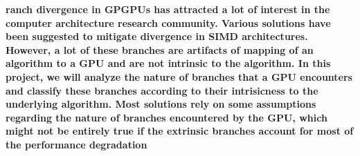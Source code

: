 
\textbf{ranch divergence in GPGPUs has attracted a lot of interest in the computer architecture research community. Various solutions have been suggested to mitigate divergence in SIMD architectures. However, a lot of these branches are artifacts of mapping of an algorithm to a GPU and are not intrinsic to the algorithm. In this project, we will analyze the nature of branches that a GPU encounters and classify these branches according to their intrisicness to the underlying algorithm. Most solutions rely on some assumptions regarding the nature of branches encountered by the GPU, which might not be entirely true if the extrinsic branches account for most of the performance degradation} 


